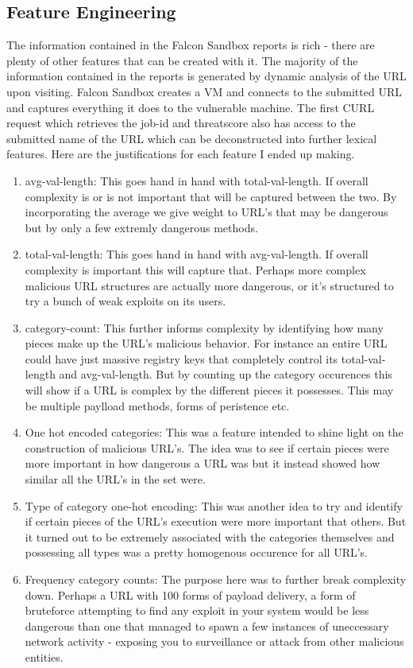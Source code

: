 \documentclass[conference]{IEEEtran}
\begin{document}
\subsection{Feature Engineering}
The information contained in the Falcon Sandbox reports is rich - there are plenty of other features that can be created with it. The majority of the information contained in the reports is generated by dynamic analysis of the URL upon visiting. Falcon Sandbox creates a VM and connects to the submitted URL and captures everything it does to the vulnerable machine. The first CURL request which retrieves the job-id and threatscore also has access to the submitted name of the URL which can be deconstructed into further lexical features. Here are the justifications for each feature I ended up making.\\
\begin{enumerate}
\item avg-val-length: This goes hand in hand with total-val-length. If overall complexity is or is not important that will be captured between the two. By incorporating the average we give weight to URL's that may be dangerous but by only a few extremly dangerous methods.\\
\item total-val-length: This goes hand in hand with avg-val-length. If overall complexity is important this will capture that. Perhaps more complex malicious URL structures are actually more dangerous, or it's structured to try a bunch of weak exploits on its users.\\
\item category-count: This further informs complexity by identifying how many pieces make up the URL's malicious behavior. For instance an entire URL could have just massive registry keys that completely control its total-val-length and avg-val-length. But by counting up the category occurences this will show if a URL is complex by the different pieces it possesses. This may be multiple paylload methods, forms of peristence etc.\\
\item One hot encoded categories: This was a feature intended to shine light on the construction of malicious URL's. The idea was to see if certain pieces were more important in how dangerous a URL was but it instead showed how similar all the URL's in the set were.\\
\item Type of category one-hot encoding: This was another idea to try and identify if certain pieces of the URL's execution were more important that others. But it turned out to be extremely associated with the categories themselves and possessing all types was a pretty homogenous occurence for all URL's.\\
\item Frequency category counts: The purpose here was to further break complexity down. Perhaps a URL with 100 forms of payload delivery, a form of bruteforce attempting to find any exploit in your system would be less dangerous than one that managed to spawn a few instances of uneccessary network activity - exposing you to surveillance or attack from other malicious entities.\\


\end{enumerate}
\end{document}
